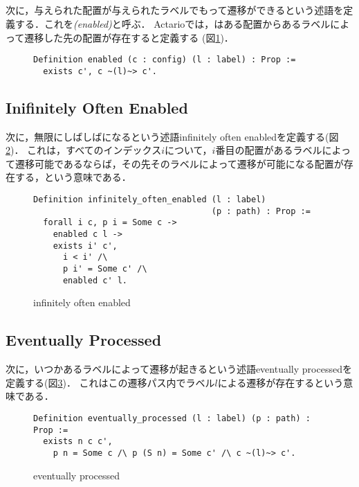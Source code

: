 \subsection{\enabled}
次に，与えられた配置が与えられたラベルでもって遷移ができるという述語を定義する．これを\emph{\enabled (enabled)}と呼ぶ．
Actarioでは，\enabled はある配置からあるラベルによって遷移した先の配置が存在すると定義する (図\ref{code:formalization:enabled})．

\begin{figure}[tp]
\begin{lstlisting}
Definition enabled (c : config) (l : label) : Prop :=
  exists c', c ~(l)~> c'.
\end{lstlisting}
  \caption{\enabled}\label{code:formalization:enabled}
\end{figure}

\subsection{Inifinitely Often Enabled}
次に，無限にしばしば\enabled になるという述語infinitely often enabledを定義する(図\ref{code:proof:infinitely-often-enabled})．
これは，すべてのインデックス$i$について，$i$番目の配置があるラベルによって遷移可能であるならば，その先そのラベルによって遷移が可能になる配置が存在する，という意味である．

\begin{figure}
\begin{lstlisting}
Definition infinitely_often_enabled (l : label)
                                    (p : path) : Prop :=
  forall i c, p i = Some c ->
    enabled c l ->
    exists i' c',
      i < i' /\
      p i' = Some c' /\
      enabled c' l.
\end{lstlisting}
\caption{infinitely often enabled}\label{code:proof:infinitely-often-enabled}
\end{figure}

\subsection{Eventually Processed}
次に，いつかあるラベルによって遷移が起きるという述語eventually processedを定義する(図\ref{code:proof:eventually-processed})．
これはこの遷移パス内でラベル$l$による遷移が存在するという意味である．

\begin{figure}
\begin{lstlisting}
Definition eventually_processed (l : label) (p : path) : Prop :=
  exists n c c',
    p n = Some c /\ p (S n) = Some c' /\ c ~(l)~> c'.
\end{lstlisting}
\caption{eventually processed}\label{code:proof:eventually-processed}
\end{figure}



